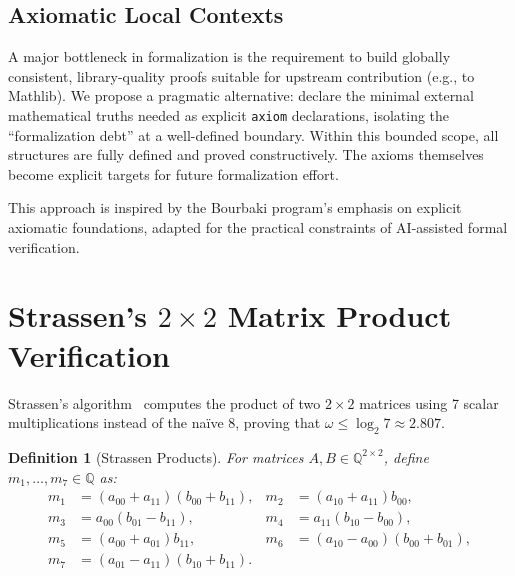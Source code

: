 \documentclass[11pt,a4paper]{article}
\newtheorem{definition}[theorem]{Definition}
\begin{document}
\subsection{Axiomatic Local Contexts}
\label{sec:alc}

A major bottleneck in formalization is the requirement to build
globally consistent, library-quality proofs suitable for upstream
contribution (e.g., to Mathlib). We propose a pragmatic alternative:
declare the minimal external mathematical truths needed as explicit
\texttt{axiom} declarations, isolating the ``formalization debt'' at a
well-defined boundary. Within this bounded scope, all structures are
fully defined and proved constructively. The axioms themselves become
explicit targets for future formalization effort.


This approach is inspired by the Bourbaki program's emphasis on
explicit axiomatic foundations, adapted for the practical constraints
of AI-assisted formal verification.


\section{Strassen's $2 \times 2$ Matrix Product Verification}
\label{sec:strassen}

Strassen's algorithm~\cite{strassen1969} computes the product of two
$2 \times 2$ matrices using 7 scalar multiplications instead of the
na\"ive 8, proving that $\omega \leq \log_2 7 \approx 2.807$.

\begin{definition}[Strassen Products]
\label{def:strassen}
For matrices $A, B \in \mathbb{Q}^{2 \times 2}$, define
$m_1, \ldots, m_7 \in \mathbb{Q}$ as:
\begin{align*}
  m_1 &= (a_{00} + a_{11})(b_{00} + b_{11}),  &
  m_2 &= (a_{10} + a_{11}) b_{00}, \\
  m_3 &= a_{00}(b_{01} - b_{11}),  &
  m_4 &= a_{11}(b_{10} - b_{00}), \\
  m_5 &= (a_{00} + a_{01}) b_{11},  &
  m_6 &= (a_{10} - a_{00})(b_{00} + b_{01}), \\
  m_7 &= (a_{01} - a_{11})(b_{10} + b_{11}).
\end{align*}
\end{definition}
\end{document}
